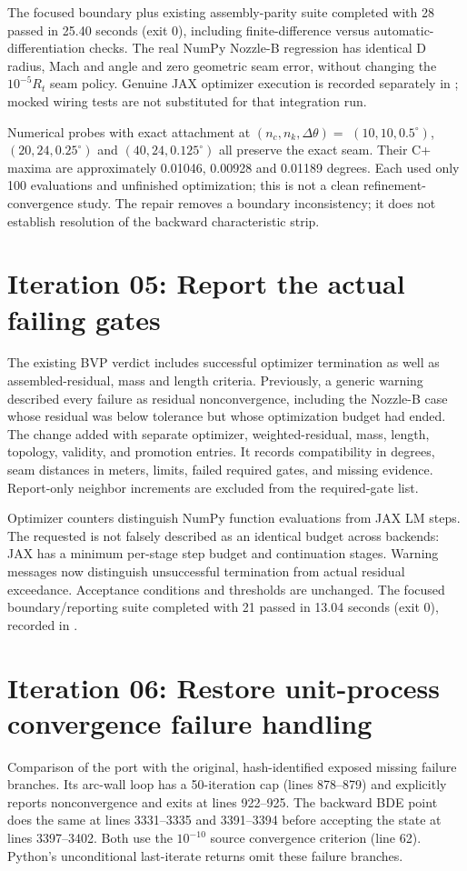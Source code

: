 The focused boundary plus existing assembly-parity suite completed with
28 passed in 25.40 seconds (exit 0), including finite-difference versus
automatic-differentiation checks. The real NumPy Nozzle-B regression has
identical D radius, Mach and angle and zero geometric seam error, without
changing the $10^{-5}R_t$ seam policy. Genuine JAX optimizer execution is
recorded separately in ; mocked wiring
tests are not substituted for that integration run.

Numerical probes with exact attachment at $(n_c,n_k,\Delta\theta)=$
$(10,10,0.5^\circ)$, $(20,24,0.25^\circ)$ and
$(40,24,0.125^\circ)$ all preserve the exact seam. Their C+ maxima are
approximately 0.01046, 0.00928 and 0.01189 degrees. Each used only
100 evaluations and unfinished optimization; this is not a clean
refinement-convergence study. The repair removes a boundary inconsistency;
it does not establish resolution of the backward characteristic strip.

\section{Iteration 05: Report the actual failing gates}
The existing BVP verdict includes successful optimizer termination as well
as assembled-residual, mass and length criteria. Previously, a generic
warning described every failure as residual nonconvergence, including the
Nozzle-B case whose residual was below tolerance but whose optimization
budget had ended. The change added 
with separate optimizer, weighted-residual, mass, length, topology, validity,
and promotion entries. It records compatibility in degrees, seam distances
in meters, limits, failed required gates, and missing evidence. Report-only
neighbor increments are excluded from the required-gate list.

Optimizer counters distinguish NumPy function evaluations from JAX LM steps.
The requested  is not falsely described as an identical budget
across backends: JAX has a minimum per-stage step budget and continuation
stages. Warning messages now distinguish unsuccessful termination from
actual residual exceedance. Acceptance conditions and thresholds are unchanged.
The focused boundary/reporting suite completed with 21 passed in 13.04
seconds (exit 0), recorded in .

\section{Iteration 06: Restore unit-process convergence failure handling}
Comparison of the port with the original, hash-identified
 exposed missing failure branches. Its arc-wall loop has a 50-iteration cap
(lines 878--879) and explicitly reports nonconvergence and exits at
lines 922--925. The backward BDE point does the same at lines 3331--3335
and 3391--3394 before accepting the state at lines 3397--3402.
Both use the $10^{-10}$ source convergence criterion (line 62).
Python's unconditional last-iterate returns omit these failure branches.

